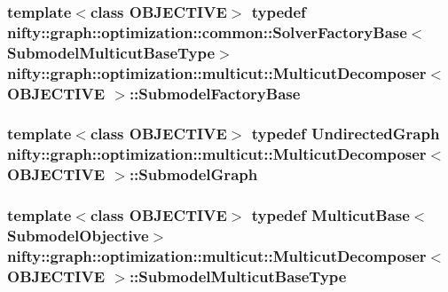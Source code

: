 \subsubsection[{Submodel\+Factory\+Base}]{\setlength{\rightskip}{0pt plus 5cm}template$<$class O\+B\+J\+E\+C\+T\+I\+V\+E$>$ typedef {\bf nifty\+::graph\+::optimization\+::common\+::\+Solver\+Factory\+Base}$<${\bf Submodel\+Multicut\+Base\+Type}$>$ {\bf nifty\+::graph\+::optimization\+::multicut\+::\+Multicut\+Decomposer}$<$ O\+B\+J\+E\+C\+T\+I\+V\+E $>$\+::{\bf Submodel\+Factory\+Base}}\label{classnifty_1_1graph_1_1optimization_1_1multicut_1_1MulticutDecomposer_ad0cfefa227a0ab22508cda89dd3a4320}
\hypertarget{classnifty_1_1graph_1_1optimization_1_1multicut_1_1MulticutDecomposer_a86839f636f1cc36c14165549418495cd}{}
\subsubsection[{Submodel\+Graph}]{\setlength{\rightskip}{0pt plus 5cm}template$<$class O\+B\+J\+E\+C\+T\+I\+V\+E$>$ typedef {\bf Undirected\+Graph} {\bf nifty\+::graph\+::optimization\+::multicut\+::\+Multicut\+Decomposer}$<$ O\+B\+J\+E\+C\+T\+I\+V\+E $>$\+::{\bf Submodel\+Graph}}\label{classnifty_1_1graph_1_1optimization_1_1multicut_1_1MulticutDecomposer_a86839f636f1cc36c14165549418495cd}
\hypertarget{classnifty_1_1graph_1_1optimization_1_1multicut_1_1MulticutDecomposer_a6e9d36ca06aabf1ffa68e511ea9f34ec}{}
\subsubsection[{Submodel\+Multicut\+Base\+Type}]{\setlength{\rightskip}{0pt plus 5cm}template$<$class O\+B\+J\+E\+C\+T\+I\+V\+E$>$ typedef {\bf Multicut\+Base}$<${\bf Submodel\+Objective}$>$ {\bf nifty\+::graph\+::optimization\+::multicut\+::\+Multicut\+Decomposer}$<$ O\+B\+J\+E\+C\+T\+I\+V\+E $>$\+::{\bf Submodel\+Multicut\+Base\+Type}}\label{classnifty_1_1graph_1_1optimization_1_1multicut_1_1MulticutDecomposer_a6e9d36ca06aabf1ffa68e511ea9f34ec}
\hypertarget{classnifty_1_1graph_1_1optimization_1_1multicut_1_1MulticutDecomposer_a21832b392d9987edc34295434ec8ebb2}{}
